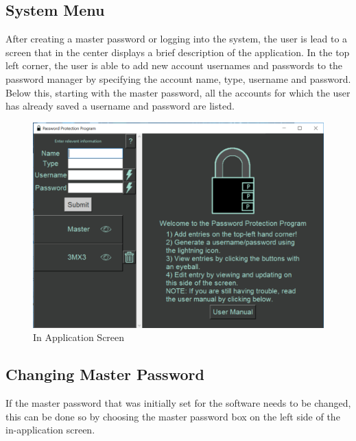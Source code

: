 \documentclass[12pt, titlepage]{article}
\begin{document}
\newpage 
\subsection{System Menu} \label{SysMenu}

After creating a master password or logging into the system, the user is lead to a screen that in the center displays a brief description of the application. In the top left corner, the user is able to add new account usernames and passwords to the password manager by specifying the account name, type, username and password. Below this, starting with the master password, all the accounts for which the user has already saved a username and password are listed. 


\begin{figure}[h]
	\centering
	\includegraphics[scale=0.7]{images/InAppScreen.PNG}
	\caption{In Application Screen}
	\label{fig:InApp}
\end{figure}

\newpage
\subsection{Changing Master Password} \label{ChangeMasPass}

If the master password that was initially set for the software needs to be changed, this can be done so by choosing the master password box on the left side of the in-application screen.
\end{document}
